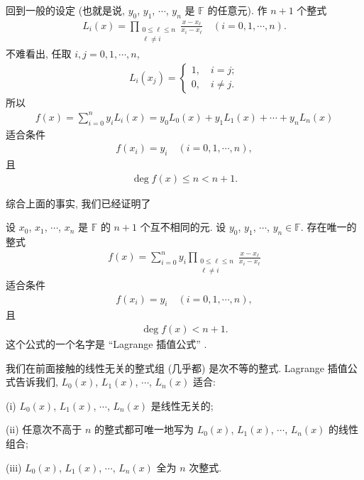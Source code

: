 回到一般的设定 (也就是说, $y_0$, $y_1$, $\cdots$, $y_n$ 是 $\mathbb{F}$ 的任意元). 作 $n+1$ 个整式
\begin{align*}
    L_{i} (x) = \prod_{\begin{smallmatrix}0 \leq \ell \leq n \\\ell \neq i\end{smallmatrix}} \frac{x - x_\ell}{x_i - x_\ell} \quad (i = 0,1,\cdots,n).
\end{align*}
不难看出, 任取 $i,j = 0,1,\cdots,n$,
\begin{align*}
    L_{i} (x_j) = \begin{cases}
        1, \quad i = j; \\
        0, \quad i \neq j.
    \end{cases}
\end{align*}
所以
\begin{align*}
    f(x) = \sum_{i = 0}^{n} y_i L_{i} (x) = y_0 L_0 (x) + y_1 L_1 (x) + \cdots + y_n L_n (x)
\end{align*}
适合条件
\begin{align*}
    f(x_i) = y_i \quad (i = 0,1,\cdots,n),
\end{align*}
且
\begin{align*}
    \deg f(x) \leq n < n + 1.
\end{align*}

综合上面的事实, 我们已经证明了

\begin{proposition}
    设 $x_0$, $x_1$, $\cdots$, $x_{n}$ 是 $\mathbb{F}$ 的 $n+1$ 个互不相同的元. 设 $y_0$, $y_1$, $\cdots$, $y_{n} \in \mathbb{F}$. 存在唯一的整式
    \begin{align*}
        f(x) = \sum_{i = 0}^{n} y_i \prod_{\begin{smallmatrix}0 \leq \ell \leq n \\\ell \neq i\end{smallmatrix}} \frac{x - x_\ell}{x_i - x_\ell}
    \end{align*}
    适合条件
    \begin{align*}
        f(x_i) = y_i \quad (i = 0,1,\cdots,n),
    \end{align*}
    且
    \begin{align*}
        \deg f(x) < n + 1.
    \end{align*}
    这个公式的一个名字是 ``Lagrange 插值公式'' .
\end{proposition}

\begin{remark}
    我们在前面接触的线性无关的整式组 (几乎都) 是次不等的整式. Lagrange 插值公式告诉我们, $L_0 (x)$, $L_1 (x)$, $\cdots$, $L_n (x)$ 适合:

    (i) $L_0 (x)$, $L_1 (x)$, $\cdots$, $L_n (x)$ 是线性无关的;

    (ii) 任意次不高于 $n$ 的整式都可唯一地写为 $L_0 (x)$, $L_1 (x)$, $\cdots$, $L_n (x)$ 的线性组合;

    (iii) $L_0 (x)$, $L_1 (x)$, $\cdots$, $L_n (x)$ 全为 $n$ 次整式.
\end{remark}

